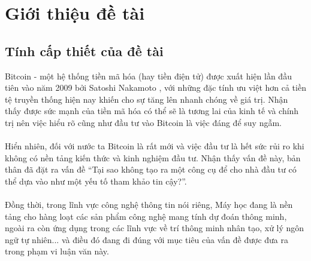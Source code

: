 \chapter{Giới thiệu đề tài}
\section{Tính cấp thiết của đề tài}
Bitcoin - một hệ thống tiền mã hóa (hay tiền điện tử) được xuất hiện lần đầu tiên 
vào năm 2009 bởi Satoshi Nakamoto \cite{Bitcoin}, với những đặc tính ưu việt hơn cả tiền tệ 
truyền thống hiện nay khiến cho sự tăng lên nhanh chóng về giá trị. Nhận thấy 
được sức mạnh của tiền mã hóa có thể sẽ là tương lai của kinh tế và chính trị 
nên việc hiểu rõ cũng như đầu tư vào Bitcoin là việc đáng để suy ngẫm.\\\\
Hiển nhiên, đối với nước ta Bitcoin là rất mới và việc đầu tư là hết sức rủi ro
khi không có nền tảng kiến thức và kinh nghiệm đầu tư. Nhận thấy vấn đề này, 
bản thân đã đặt ra vấn đề ``Tại sao không tạo ra một công cụ để cho nhà đầu tư 
có thể dựa vào như một yếu tố tham khảo tin cậy?''.\\\\
Đồng thời, trong lĩnh vực công nghệ thông tin nói riêng, Máy học đang là 
nền tảng cho hàng loạt các sản phẩm công nghệ mang tính dự đoán thông minh, ngoài 
ra còn ứng dụng trong các lĩnh vực về trí thông minh nhân tạo, xử lý ngôn ngữ 
tự nhiên... và điều đó đang đi đúng với mục tiêu của vấn đề được đưa ra trong phạm 
vi luận văn này.

